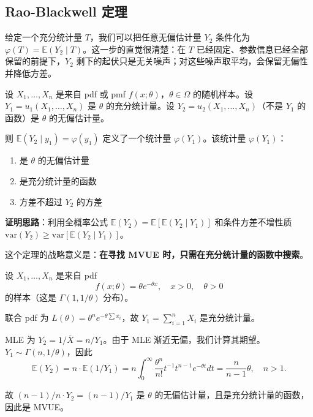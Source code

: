 \subsection{Rao-Blackwell 定理}

给定一个充分统计量 $T$，我们可以把任意无偏估计量 $Y_2$ 条件化为 $\varphi(T)=\mathbb{E}(Y_2\mid T)$。这一步的直觉很清楚：在 $T$ 已经固定、参数信息已经全部保留的前提下，$Y_2$ 剩下的起伏只是无关噪声；对这些噪声取平均，会保留无偏性并降低方差。

\begin{theorem}\label{th:rao-blackwell}
设 $X_1, \ldots, X_n$ 是来自 pdf 或 pmf $f(x; \theta)$，$\theta \in \Omega$ 的随机样本。设 $Y_1 = u_1(X_1, \ldots, X_n)$ 是 $\theta$ 的充分统计量。设 $Y_2 = u_2(X_1, \ldots, X_n)$（不是 $Y_1$ 的函数）是 $\theta$ 的无偏估计量。

则 $\mathbb{E}(Y_2 \mid y_1) = \varphi(y_1)$ 定义了一个统计量 $\varphi(Y_1)$。该统计量 $\varphi(Y_1)$：
\begin{enumerate}
\item 是 $\theta$ 的无偏估计量
\item 是充分统计量的函数
\item 方差不超过 $Y_2$ 的方差
\end{enumerate}
\end{theorem}

\textbf{证明思路}：利用全概率公式 $\mathbb{E}(Y_2) = \mathbb{E}[\mathbb{E}(Y_2 \mid Y_1)]$ 和条件方差不增性质 $\text{var}(Y_2) \geq \text{var}[\mathbb{E}(Y_2 \mid Y_1)]$。

这个定理的战略意义是：\textbf{在寻找 MVUE 时，只需在充分统计量的函数中搜索}。

\begin{example}\label{ex:exponential-mvue}
设 $X_1, \ldots, X_n$ 是来自 pdf
\[
f(x; \theta) = \theta e^{-\theta x},\quad x > 0,\quad \theta > 0
\]
的样本（这是 $\Gamma(1, 1/\theta)$ 分布）。

联合 pdf 为 $L(\theta) = \theta^n e^{-\theta \sum x_i}$，故 $Y_1 = \sum_{i=1}^n X_i$ 是充分统计量。

MLE 为 $Y_2 = 1/\overline{X} = n/Y_1$。由于 MLE 渐近无偏，我们计算其期望。$Y_1 \sim \Gamma(n, 1/\theta)$，因此
\[
\mathbb{E}(Y_2) = n \cdot \mathbb{E}(1/Y_1) = n \int_0^\infty \frac{\theta^n}{n!} t^{-1} t^{n-1} e^{-\theta t} dt = \frac{n}{n-1}\theta,\quad n > 1.
\]

故 $(n-1)/n \cdot Y_2 = (n-1)/Y_1$ 是 $\theta$ 的无偏估计量，且是充分统计量的函数，因此是 MVUE。
\end{example}

